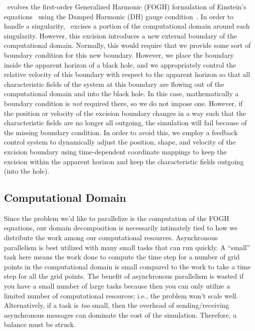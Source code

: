 \begin{bibunit}[unsrtnat]
\spectre~evolves the first-order Generalized Harmonic (FOGH) formulation of
Einstein's equations~\cite{Lindblom:2005qh} using the Damped Harmonic (DH) gauge
condition~\cite{Szilagyi:2009qz, Deppe2018:uye}. In order to handle a
singularity, \spectre~excises a portion of the computational domain around each
singularity. However, this excision introduces a new external boundary of the
computational domain. Normally, this would require that we provide some sort of
boundary condition for this new boundary. However, we place the boundary inside
the apparent horizon of a black hole, and we appropriately control the relative
velocity of this boundary with respect to the apparent horizon so that all
characteristic fields of the system at this boundary are flowing out of the
computational domain and into the black hole. In this case, mathematically a
boundary condition is \textit{not} required there, so we do not impose one.
However, if the position or velocity of the excision boundary changes in a way
such that the characteristic fields are no longer all outgoing, the simulation
will fail because of the missing boundary condition. In order to avoid this, we
employ a feedback control system to dynamically adjust the position, shape, and
velocity of the excision boundary using time-dependent coordinate mappings to
keep the excision within the apparent horizon and keep the characteristic fields
outgoing (into the hole).

\subsection{Computational Domain\label{sec:domain}}
Since the problem we'd like to parallelize is the computation of the FOGH
equations, our domain decomposition is necessarily intimately tied to how we
distribute the work among our computational resources. Asynchronous parallelism
is best utilized with many small tasks that can run quickly. A ``small''
task here
means the work done to compute the time step for a number of grid points in the
computational domain is small compared to the work to take a time step
for all the grid points. The benefit of
asynchronous parallelism is wasted if you have a small number of large tasks
because then you can only utilize a limited number of computational resources;
i.e., the problem won't scale well. Alternatively, if a task is \textit{too}
small, then the overhead of sending/receiving asynchronous messages can dominate
the cost of the simulation. Therefore, a balance must be struck.


\end{bibunit}
